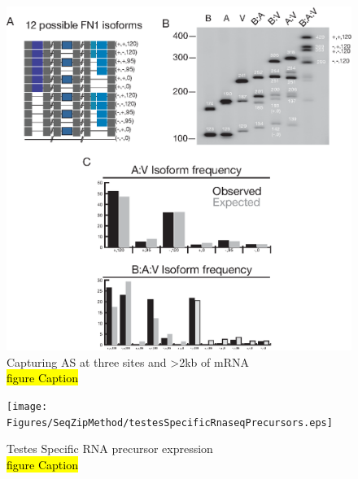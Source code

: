   \begin{figure}[htbp] %
    \centering 
    \includegraphics{Figures/SeqZipMethod/fn1ThreeSite.eps}
    \caption[Three sites of AS in \fn{} by SeqZip]
    {
      Capturing AS at three sites and >2kb of mRNA\\
      \hl{figure Caption}
	    }
    \label{fig:Hiv tx via SeqZip}
  	\end{figure}

  \begin{figure}[htbp] %
    \centering 
    \texttt{[image: Figures/SeqZipMethod/testesSpecificRnaseqPrecursors.eps]}
    \caption[Testes Specific RNA precursor expression]
    {
      Testes Specific RNA precursor expression\\
      \hl{figure Caption}
    	}
    \label{fig:Hiv tx via SeqZip}
  	\end{figure}

